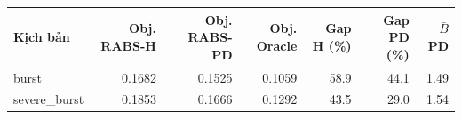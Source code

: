 \begin{tabular}{lrrrrrr}
\toprule
Kịch bản & Obj. RABS-H & Obj. RABS-PD & Obj. Oracle & Gap H (\%) & Gap PD (\%) & $\bar{B}$ PD \\
\midrule
burst & 0.1682 & 0.1525 & 0.1059 & 58.9 & 44.1 & 1.49 \\
severe\_burst & 0.1853 & 0.1666 & 0.1292 & 43.5 & 29.0 & 1.54 \\
\bottomrule
\end{tabular}
